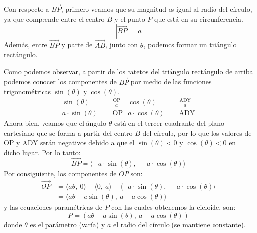 \documentclass[12pt]{article}
\begin{document}
Con respecto a $\overrightarrow{BP}$, primero veamos que su magnitud es igual al radio del círculo, ya que comprende entre el centro $B$ y el punto $P$ que está en su circunferencia.
\[
  \left|\overrightarrow{BP}\right| = a
\]
Además, entre $\overrightarrow{BP}$ y parte de $\overrightarrow{AB}$, junto con $\theta$, podemos formar un triángulo rectángulo.

\begin{figure}[hbt!]
\centering


\end{figure}

Como podemos observar, a partir de los catetos del triángulo rectángulo de arriba podemos conocer los componentes de $\overrightarrow{BP}$ por medio de las funciones trigonométricas $\sin(\theta)$ y $\cos(\theta)$.
\begin{align*}
  \sin(\theta) &= \frac{\mathrm{OP}}{a} & \cos(\theta) &= \frac{\mathrm{ADY}}{a} \\
  a \cdot \sin(\theta) &= \mathrm{OP} & a \cdot \cos(\theta) &= \mathrm{ADY}
\end{align*}
Ahora bien, veamos que el ángulo $\theta$ está en el tercer cuadrante del plano cartesiano que se forma a partir del centro $B$ del círculo, por lo que los valores de OP y ADY serán negativos debido a que el $\sin(\theta) < 0$ y $\cos(\theta) < 0$ en dicho lugar. Por lo tanto:
\[
  \overrightarrow{BP} = \langle -a \cdot \sin(\theta), \ -a \cdot \cos(\theta) \rangle
\]
Por consiguiente, los componentes de $\overrightarrow{OP}$ son:
\begin{align*}
  \overrightarrow{OP} &= \langle a \theta, \ 0 \rangle + \langle 0, \ a \rangle + \langle -a \cdot \sin(\theta), \ -a \cdot \cos(\theta) \rangle \\
                      &= \langle a \theta - a \sin(\theta), \ a - a \cos(\theta) \rangle
\end{align*}
y las ecuaciones paramétricas de $P$ con las cuales obtenemos la cicloide, son:
\[
  P = (a \theta - a \sin(\theta), \ a - a \cos(\theta))
\]
donde $\theta$ es el parámetro (varía) y $a$ el radio del círculo (se mantiene constante).
\end{document}
